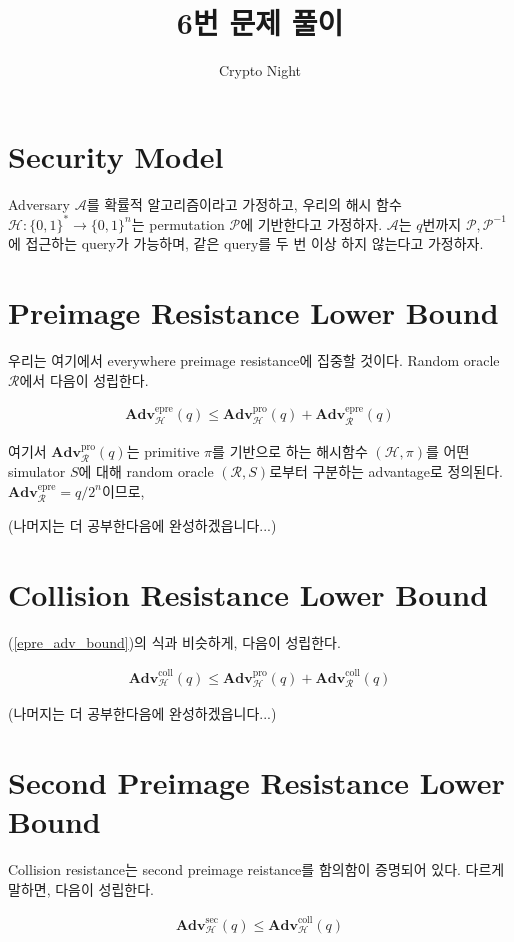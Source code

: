 \documentclass{article}
\title{6번 문제 풀이}
\author{Crypto Night}
\newcommand{\adv}{\mathbf{Adv}}
\begin{document}
  \maketitle

  \section{Security Model}
  Adversary \(\mathcal{A}\)를 확률적 알고리즘이라고 가정하고, 우리의 해시 함수 \(\mathcal{H}: \{0, 1\}^* \to \{0, 1\}^n\)는 permutation \(\mathcal{P}\)에 기반한다고 가정하자. \(\mathcal{A}\)는 \(q\)번까지 \(\mathcal{P}, \mathcal{P}^{-1}\)에 접근하는 query가 가능하며, 같은 query를 두 번 이상 하지 않는다고 가정하자.

  \section{Preimage Resistance Lower Bound}
  우리는 여기에서 everywhere preimage resistance에 집중할 것이다.\cite{rogaway_cryptographic_2004} Random oracle \(\mathcal{R}\)에서 다음이 성립한다.\cite{andreeva_security_2011}

  \begin{align}\label{epre_adv_bound}
    \adv^\text{epre}_\mathcal{H}(q) \leq \adv^\text{pro}_\mathcal{H}(q) + \adv^\text{epre}_\mathcal{R}(q)
  \end{align}

  여기서 \(\adv^\text{pro}_\mathcal{R}(q)\)는 primitive \(\pi\)를 기반으로 하는 해시함수 \((\mathcal{H}, \pi)\)를 어떤 simulator \(S\)에 대해 random oracle \((\mathcal{R}, S)\)로부터 구분하는 advantage로 정의된다. \(\adv^\text{epre}_\mathcal{R}=q/2^n\)이므로,

  (나머지는 더 공부한다음에 완성하겠읍니다...)

  \section{Collision Resistance Lower Bound}
  (\ref{epre_adv_bound})의 식과 비슷하게, 다음이 성립한다.

  \begin{align*}
    \adv^\text{coll}_\mathcal{H}(q) \leq \adv^\text{pro}_\mathcal{H}(q) + \adv^\text{coll}_\mathcal{R}(q)
  \end{align*}

  (나머지는 더 공부한다음에 완성하겠읍니다...)

  \section{Second Preimage Resistance Lower Bound}
  Collision resistance는 second preimage reistance를 함의함이 증명되어 있다.\cite{rogaway_cryptographic_2004} 다르게 말하면, 다음이 성립한다.

  \begin{align*}
    \adv^\text{sec}_\mathcal{H}(q) \leq \adv^\text{coll}_\mathcal{H}(q)
  \end{align*}

  \printbibliography
\end{document}
